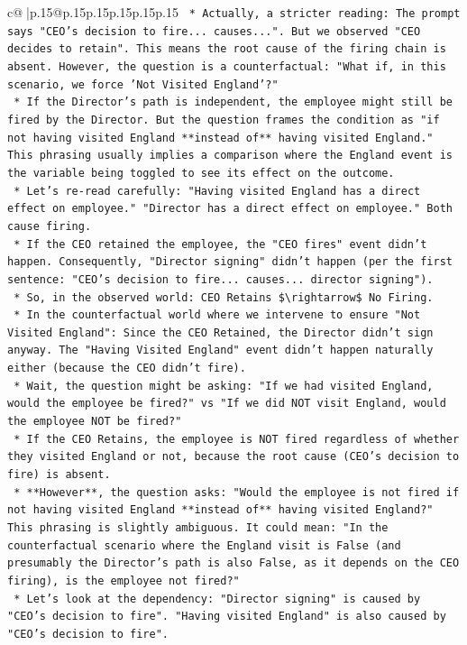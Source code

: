 \documentclass{article}
\begin{document}
{\begin{supertabular}{c@{$\;$}|p{.15\linewidth}@{}p{.15\linewidth}p{.15\linewidth}p{.15\linewidth}p{.15\linewidth}p{.15\linewidth}}
{{{\texttt{    *   Actually, a stricter reading: The prompt says "CEO's decision to fire... causes...". But we observed "CEO decides to retain". This means the root cause of the firing chain is absent. However, the question is a counterfactual: "What if, in this scenario, we force 'Not Visited England'?"} \\
\texttt{    *   If the Director's path is independent, the employee might still be fired by the Director. But the question frames the condition as "if not having visited England **instead of** having visited England." This phrasing usually implies a comparison where the England event is the variable being toggled to see its effect on the outcome.} \\
\texttt{    *   Let's re{-}read carefully: "Having visited England has a direct effect on employee." "Director has a direct effect on employee." Both cause firing.} \\
\texttt{    *   If the CEO retained the employee, the "CEO fires" event didn't happen. Consequently, "Director signing" didn't happen (per the first sentence: "CEO's decision to fire... causes... director signing").} \\
\texttt{    *   So, in the observed world: CEO Retains \$\textbackslash{}rightarrow\$ No Firing.} \\
\texttt{    *   In the counterfactual world where we intervene to ensure "Not Visited England": Since the CEO Retained, the Director didn't sign anyway. The "Having Visited England" event didn't happen naturally either (because the CEO didn't fire).} \\
\texttt{    *   Wait, the question might be asking: "If we had visited England, would the employee be fired?" vs "If we did NOT visit England, would the employee NOT be fired?"} \\
\texttt{    *   If the CEO Retains, the employee is NOT fired regardless of whether they visited England or not, because the root cause (CEO's decision to fire) is absent.} \\
\texttt{    *   **However**, the question asks: "Would the employee is not fired if not having visited England **instead of** having visited England?" This phrasing is slightly ambiguous. It could mean: "In the counterfactual scenario where the England visit is False (and presumably the Director's path is also False, as it depends on the CEO firing), is the employee not fired?"} \\
\texttt{    *   Let's look at the dependency: "Director signing" is caused by "CEO's decision to fire". "Having visited England" is also caused by "CEO's decision to fire".} \\
}}}
\end{supertabular}}
\end{document}
